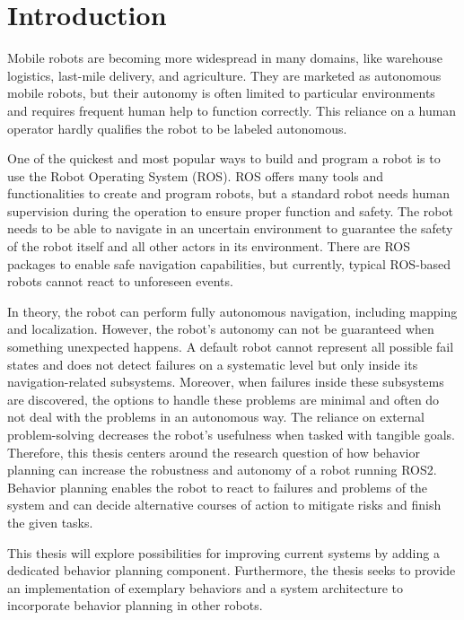 \chapter{Introduction}
\label{cha:introduction}

Mobile robots are becoming more widespread in many domains, like warehouse logistics, last-mile delivery, and agriculture. They are marketed as autonomous mobile robots, but their autonomy is often limited to particular environments and requires frequent human help to function correctly. This reliance on a human operator hardly qualifies the robot to be labeled autonomous. 

One of the quickest and most popular ways to build and program a robot is to use the Robot Operating System (ROS). ROS offers many tools and functionalities to create and program robots, but a standard robot needs human supervision during the operation to ensure proper function and safety. The robot needs to be able to navigate in an uncertain environment to guarantee the safety of the robot itself and all other actors in its environment. There are ROS packages to enable safe navigation capabilities, but currently, typical ROS-based robots cannot react to unforeseen events.

In theory, the robot can perform fully autonomous navigation, including mapping and localization. However, the robot's autonomy can not be guaranteed when something unexpected happens. A default robot cannot represent all possible fail states and does not detect failures on a systematic level but only inside its navigation-related subsystems. Moreover, when failures inside these subsystems are discovered, the options to handle these problems are minimal and often do not deal with the problems in an autonomous way. The reliance on external problem-solving decreases the robot's usefulness when tasked with tangible goals. 
Therefore, this thesis centers around the research question of how behavior planning can increase the robustness and autonomy of a robot running ROS2. Behavior planning enables the robot to react to failures and problems of the system and can decide alternative courses of action to mitigate risks and finish the given tasks.

This thesis will explore possibilities for improving current systems by adding a dedicated behavior planning component. Furthermore, the thesis seeks to provide an implementation of exemplary behaviors and a system architecture to incorporate behavior planning in other robots.

